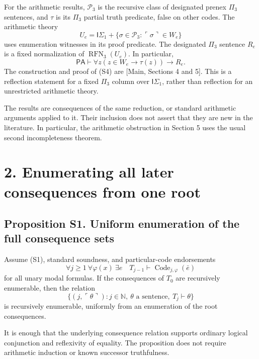 \documentclass[
  11pt,
  letterpaper,
]{article}
\begin{document}
For the arithmetic results, \(\mathcal P_3\) is the recursive class of
designated prenex \(\Pi_3\) sentences, and \(\tau\) is its \(\Pi_3\)
partial truth predicate, false on other codes. The arithmetic theory \[
U_e=\mathsf I\Sigma_1+
\{\sigma\in\mathcal P_3:\ulcorner\sigma\urcorner\in W_e\}
\tag{S3}
\] uses enumeration witnesses in its proof predicate. The designated
\(\Pi_3\) sentence \(R_e\) is a fixed normalization of
\(\operatorname{RFN}_3(U_e)\). In particular, \[
\mathsf{PA}\vdash
\forall z(z\in W_e\rightarrow\tau(z))\rightarrow R_e.
\tag{S4}
\] The construction and proof of (S4) are {[}Main, Sections 4 and 5{]}.
This is a reflection statement for a fixed \(\Pi_3\) column over
\(\mathsf I\Sigma_1\), rather than reflection for an unrestricted
arithmetic theory.

The results are consequences of the same reduction, or standard
arithmetic arguments applied to it. Their inclusion does not assert that
they are new in the literature. In particular, the arithmetic
obstruction in Section 5 uses the usual second incompleteness theorem.

\section{2. Enumerating all later consequences from one
root}\label{enumerating-all-later-consequences-from-one-root}

\subsection{Proposition S1. Uniform enumeration of the full consequence
sets}\label{proposition-s1.-uniform-enumeration-of-the-full-consequence-sets}

Assume (S1), standard soundness, and particular-code endorsements \[
\forall j\geq1\ \forall\varphi(x)\ \exists e\quad
T_{j-1}\vdash\operatorname{Code}_{j,\varphi}(\bar e)
\tag{S5}
\] for all unary modal formulas. If the consequences of \(T_0\) are
recursively enumerable, then the relation \[
\{(j,\ulcorner\theta\urcorner):j\in\mathbb N,
\ \theta\text{ a sentence},\ T_j\vdash\theta\}
\tag{S6}
\] is recursively enumerable, uniformly from an enumeration of the root
consequences.

It is enough that the underlying consequence relation supports ordinary
logical conjunction and reflexivity of equality. The proposition does
not require arithmetic induction or known successor truthfulness.
\end{document}
